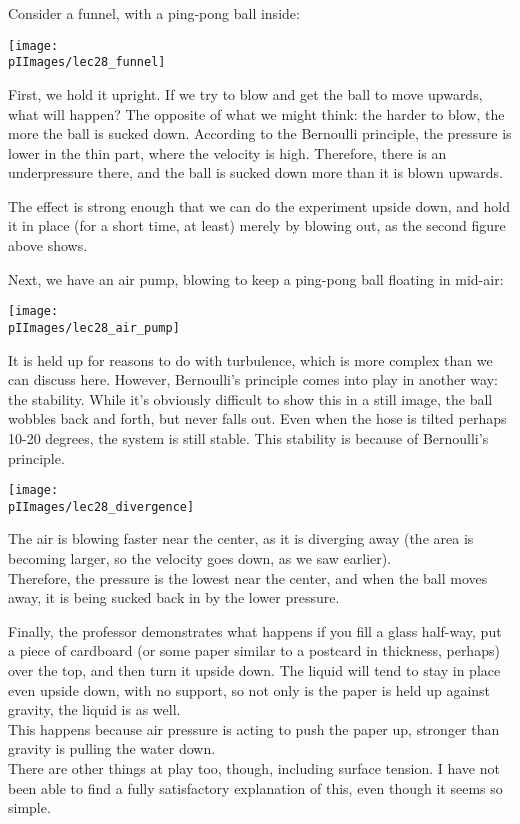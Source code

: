 Consider a funnel, with a ping-pong ball inside:

\begin{center}
\texttt{[image: \\pIImages/lec28\_funnel]}
\end{center}

First, we hold it upright. If we try to blow and get the ball to move upwards, what will happen? The opposite of what we might think: the harder to blow, the more the ball is sucked down. According to the Bernoulli principle, the pressure is lower in the thin part, where the velocity is high. Therefore, there is an underpressure there, and the ball is sucked down more than it is blown upwards.

The effect is strong enough that we can do the experiment upside down, and hold it in place (for a short time, at least) merely by blowing out, as the second figure above shows.

Next, we have an air pump, blowing to keep a ping-pong ball floating in mid-air:

\begin{center}
\texttt{[image: \\pIImages/lec28\_air\_pump]}
\end{center}

It is held up for reasons to do with turbulence, which is more complex than we can discuss here. However, Bernoulli's principle comes into play in another way: the stability. While it's obviously difficult to show this in a still image, the ball wobbles back and forth, but never falls out. Even when the hose is tilted perhaps 10-20 degrees, the system is still stable. This stability is because of Bernoulli's principle.

\begin{center}
\texttt{[image: \\pIImages/lec28\_divergence]}
\end{center}

The air is blowing faster near the center, as it is diverging away (the area is becoming larger, so the velocity goes down, as we saw earlier).\\
Therefore, the pressure is the lowest near the center, and when the ball moves away, it is being sucked back in by the lower pressure.

Finally, the professor demonstrates what happens if you fill a glass half-way, put a piece of cardboard (or some paper similar to a postcard in thickness, perhaps) over the top, and then turn it upside down. The liquid will tend to stay in place even upside down, with no support, so not only is the paper is held up against gravity, the liquid is as well.\\
This happens because air pressure is acting to push the paper up, stronger than gravity is pulling the water down.\\
There are other things at play too, though, including surface tension. I have not been able to find a fully satisfactory explanation of this, even though it seems so simple.

